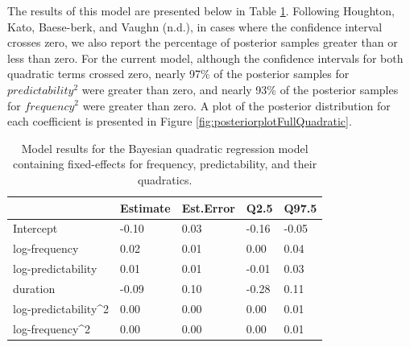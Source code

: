 \documentclass[
  man,floatsintext]{apa6}
\begin{document}
The results of this model are presented below in Table \ref{tab:brmsQuadraticNoInter}. Following Houghton, Kato, Baese-berk, and Vaughn (n.d.), in cases where the confidence interval crosses zero, we also report the percentage of posterior samples greater than or less than zero. For the current model, although the confidence intervals for both quadratic terms crossed zero, nearly 97\% of the posterior samples for \(predictability^2\) were greater than zero, and nearly 93\% of the posterior samples for \(frequency^2\) were greater than zero. A plot of the posterior distribution for each coefficient is presented in Figure \ref{fig:posteriorplotFullQuadratic}.

\begin{table}[H]

\begin{center}
\begin{threeparttable}

\caption{\label{tab:brmsQuadraticNoInter}Model results for the Bayesian quadratic regression model containing fixed-effects for frequency, predictability, and their quadratics.}

\begin{tabular}{lllll}
\toprule
 & \multicolumn{1}{c}{Estimate} & \multicolumn{1}{c}{Est.Error} & \multicolumn{1}{c}{Q2.5} & \multicolumn{1}{c}{Q97.5}\\
\midrule
Intercept & -0.10 & 0.03 & -0.16 & -0.05\\
log-frequency & 0.02 & 0.01 & 0.00 & 0.04\\
log-predictability & 0.01 & 0.01 & -0.01 & 0.03\\
duration & -0.09 & 0.10 & -0.28 & 0.11\\
log-predictability\textasciicircum{}2 & 0.00 & 0.00 & 0.00 & 0.01\\
log-frequency\textasciicircum{}2 & 0.00 & 0.00 & 0.00 & 0.01\\
\bottomrule
\end{tabular}

\end{threeparttable}
\end{center}

\end{table}
\end{document}
